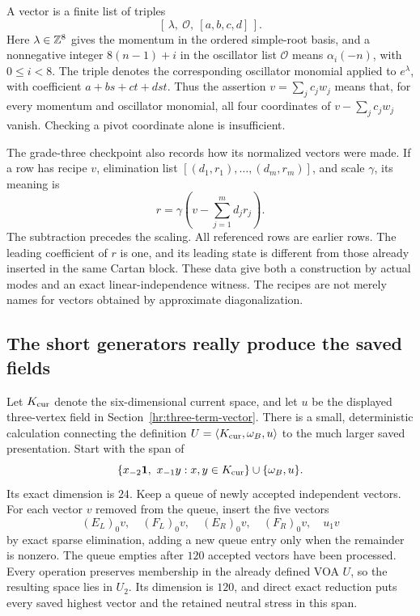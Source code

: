 A vector is a finite list of triples
\[
       [\,\lambda,\ \mathcal O,\ [a,b,c,d]\,].
\]
Here $\lambda\in\mathbb Z^8$ gives the momentum in the ordered simple-root
basis, and a nonnegative integer $8(n-1)+i$ in the oscillator list
$\mathcal O$ means $\alpha_i(-n)$, with $0\leq i<8$.
The triple denotes the corresponding oscillator monomial applied to
$e^\lambda$, with coefficient $a+bs+ct+dst$.
Thus the assertion $v=\sum_jc_jw_j$ means that, for every momentum
and oscillator monomial, all four coordinates of
$v-\sum_jc_jw_j$ vanish.  Checking a pivot coordinate alone is
insufficient.

The grade-three checkpoint also records how its normalized vectors
were made.  If a row has recipe $v$, elimination list
$[(d_1,r_1),\ldots,(d_m,r_m)]$, and scale $\gamma$, its meaning is
\begin{equation}\label{eq:reader-row-recipe}
       r=\gamma\left(v-\sum_{j=1}^m d_jr_j\right).
\end{equation}
The subtraction precedes the scaling.  All referenced rows are earlier
rows.  The leading coefficient of $r$ is one, and its leading state
is different from those already inserted in the same Cartan block.
These data give both a construction by actual modes and an exact
linear-independence witness.  The recipes are not merely names for
vectors obtained by approximate diagonalization.

\subsection{The short generators really produce the saved fields}

Let $K_{\rm cur}$ denote the six-dimensional current space, and let
$u$ be the displayed three-vertex field in
Section~\ref{hr:three-term-vector}.
There is a small, deterministic calculation connecting the definition
$U=\langle K_{\rm cur},\omega_B,u\rangle$ to the much larger saved
presentation.  Start with the span of
\[
 \{x_{-2}\mathbf1,\ x_{-1}y:x,y\in K_{\rm cur}\}
                   \cup\{\omega_B,u\}.
\]
Its exact dimension is $24$.  Keep a queue of newly accepted independent
vectors.  For each vector $v$ removed from the queue, insert the five
vectors
\[
       (E_L)_0v,\quad(F_L)_0v,\quad(E_R)_0v,\quad(F_R)_0v,
                          \quad u_1v
\]
by exact sparse elimination, adding a new queue entry only when the
remainder is nonzero.  The queue empties after $120$ accepted vectors
have been processed.  Every operation preserves membership in the
already defined VOA $U$, so the resulting space lies in $U_2$.
Its dimension is $120$, and direct exact reduction puts every saved
highest vector and the retained neutral stress in this span.

